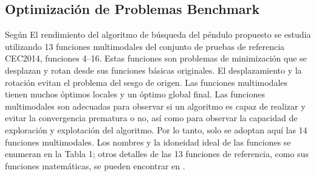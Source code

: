 \documentclass[conference]{IEEEtran}
\begin{document}
\subsection{Optimización de Problemas Benchmark}

Según \cite{aziz2022} El rendimiento del algoritmo de búsqueda del péndulo
propuesto se estudia utilizando 13
funciones
multimodales del conjunto de pruebas de referencia CEC2014, funciones 4--16.
Estas funciones son problemas de minimización que se desplazan y rotan desde
sus funciones básicas originales. El desplazamiento y la rotación evitan el
problema del sesgo de origen. Las funciones multimodales tienen muchos óptimos
locales y un óptimo global final. Las funciones multimodales son adecuadas para
observar si un algoritmo es capaz de realizar y evitar la convergencia
prematura o no, así como para observar la capacidad de exploración y
explotación del algoritmo. Por lo tanto, solo se adoptan aquí las 14 funciones
multimodales. Los nombres y la idoneidad ideal de las funciones se enumeran en
la Tabla 1; otros detalles de las 13 funciones de referencia, como sus
funciones matemáticas, se pueden encontrar en \cite{Liang2013}.
\end{document}
